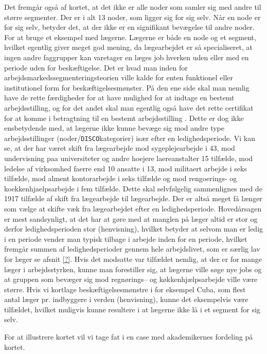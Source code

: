 Det fremgår også af kortet, at det ikke er alle noder som samler sig med andre til større segmenter. Der er i alt 13 noder, som ligger sig for sig selv. Når en node er for sig selv, betyder det, at der ikke er en signifikant bevægelse til andre noder. For at bruge et eksempel med lægerne. Lægerne er både en node og et segment, hvilket egentlig giver meget god mening, da lægearbejdet er så specialiseret, at ingen andre faggrupper kan varetager en læges job hverken uden eller med en periode uden for beskæftigelse. Det er hvad man inden for arbejdsmarkedssegmenteringsteorien ville kalde for enten funktionel eller institutionel form for beskæftigelsesmønster. På den ene side skal man nemlig have de rette færdigheder for at have mulighed for at indtage en bestemt arbejdsstilling, og for det andet skal man egentlig også have det rette certifikat for at komme i betragtning til en bestemt arbejdsstilling \parencite[3]{TouboelLarsenJensen2013} \parencite[4]{TouboelLarsen2015}. Dette er dog ikke ensbetydende med, at lægerne ikke kunne bevæge sig mod andre type arbejdsstillinger (noder/\texttt{DISCO}kategorier) især efter en ledighedsperiode. Vi kan se, at der har været skift fra lægearbejde mod sygeplejearbejde i 43, mod undervisning paa universiteter og andre hoejere laereanstalter 15 tilfælde, mod ledelse af virksomhed faerre end 10 ansatte i 13, mod militaert arbejde i seks tilfælde, mod alment kontorarbejde i seks tilfælde og mod rengoerings- og koekkenhjaelpsarbejde i fem tilfælde. Dette skal selvfølgelig sammenlignes med de 1917 tilfælde af skift fra lægearbejde til lægearbejde. Der er altså meget få længer som vælge at skifte væk fra lægearbejdet efter en ledighedsperiode. Hovedårsagen er mest sandsynligt, at det har at gøre med at manglen på læger altid er stor og derfor ledighedsperioden stor (henvisning), hvilket betyder at selvom man er ledig i en periode vender man typisk tilbage i arbejde inden for en periode, hvilket fremgår summen af ledighedsperioder gennem hele arbejdslivet, som er særlig lav for læger se afsnit \ref{?}. Hvis det modsatte var tilfældet nemlig, at der er for mange læger i arbejdsstyrken, kunne man forestiller sig, at lægerne ville søge nye jobs og at gruppen som bevæger sig mod regnørings-- og køkkenhjælpsarbejde ville være større. Hvis vi kortlage beskæftigelsesmønstre i for eksempel Cuba, som flest antal læger pr. indbyggere i verden (henvisning), kunne det eksempelvis være tilfældet, hvilket muligvis kunne resultere i at lægerne ikke lå i et segment for sig selv.

For at illustrere kortet vil vi tage fat i en case med akademikernes fordeling på kortet.



